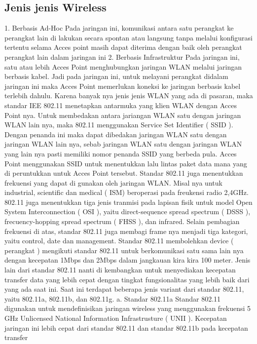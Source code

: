 \subsection
{Jenis jenis Wireless}
1. Berbasis Ad-Hoc
Pada jaringan ini, komunikasi antara satu perangkat ke perangkat lain di lakukan secara
spontan atau langsung tanpa melalui konfigurasi tertentu selama Acces point masih dapat
diterima dengan baik oleh perangkat perangkat lain dalam jaringan ini
2. Berbasis Infrastruktur
Pada jaringan ini, satu atau lebih Acces Point menghubungkan jaringan WLAN melalui
jaringan berbasis kabel. Jadi pada jaringan ini, untuk melayani perangkat didalam
jaringan ini maka Acces Point memerlukan koneksi ke jaringan berbasis kabel terlebih
dahulu.
Karena banyak nya jenis jenis WLAN yang ada di pasaran, maka standar IEE 802.11
menetapkan antarmuka yang klien WLAN dengan Acces Point nya. Untuk membedakan
antara jariangan WLAN satu dengan jaringan WLAN lain nya, maka 802.11
menggunakan Service Set Identifier ( SSID ). Dengan penanda ini maka dapat dibedakan
jaringan WLAN satu dengan jaringan WLAN lain nya, sebab jaringan WLAN satu
dengan jaringan WLAN yang lain nya pasti memiliki nomor penanda SSID yang berbeda
pula. Acces Point menggunakan SSID untuk menentukkan lalu lintas paket data mana
yang di peruntukkan untuk Acces Point tersebut.
Standar 802.11 juga menentukkan frekuensi yang dapat di gunakan oleh jaringan WLAN.
Misal nya untuk industrial, scientific dan medical ( ISM) beroperasi pada freukensi radio
2,4GHz. 802.11 juga menentukkan tiga jenis tranmisi pada lapisan fisik untuk model
Open System Interconnection ( OSI ), yaitu direct-sequence spread spectrum ( DSSS ),
frecuency-hopping spread spectrum ( FHSS ), dan infrared. Selain pembagian frekuensi
di atas, standar 802.11 juga membagi frame nya menjadi tiga kategori, yaitu control, date
dan management.
Standar 802.11 membolehkan device ( perangkat ) mengikuti standar 802.11 untuk
berkomunikasi satu sama lain nya dengan kecepatan 1Mbps dan 2Mbps dalam jangkauan
kira kira 100 meter. Jenis lain dari standar 802.11 nanti di kembangkan untuk
menyediakan kecepatan transfer data yang lebih cepat dengan tingkat fungsionalitas yang
lebih baik dari yang ada saat ini. Saat ini terdapat beberapa jenis variant dari standar
802.11, yaitu 802.11a, 802.11b, dan 802.11g.
a. Standar 802.11a
Standar 802.11 digunakan untuk mendefinisikan jaringan wireless yang menggunakan
frekuensi 5 GHz Unlicensed National Information Infrastrusture ( UNII ). Kecepatan
jaringan ini lebih cepat dari standar 802.11 dan standar 802.11b pada kecepatan transfer
